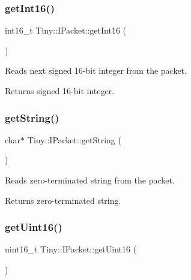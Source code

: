 \subsubsection{\texorpdfstring{get\+Int16()}{getInt16()}}
{\footnotesize\ttfamily int16\+\_\+t Tiny\+::\+I\+Packet\+::get\+Int16 (\begin{DoxyParamCaption}{ }\end{DoxyParamCaption})\hspace{0.3cm}{\ttfamily [inline]}}

Reads next signed 16-\/bit integer from the packet. \begin{DoxyReturn}{Returns}
signed 16-\/bit integer. 
\end{DoxyReturn}
\mbox{\label{classTiny_1_1IPacket_ac6e6a22ce9a652954491a8d4db081d79}} 
\subsubsection{\texorpdfstring{get\+String()}{getString()}}
{\footnotesize\ttfamily char$\ast$ Tiny\+::\+I\+Packet\+::get\+String (\begin{DoxyParamCaption}{ }\end{DoxyParamCaption})\hspace{0.3cm}{\ttfamily [inline]}}

Reads zero-\/terminated string from the packet. \begin{DoxyReturn}{Returns}
zero-\/terminated string. 
\end{DoxyReturn}
\mbox{\label{classTiny_1_1IPacket_a345d5d5791d5929c9a5f9bb2763f99a5}} 
\subsubsection{\texorpdfstring{get\+Uint16()}{getUint16()}}
{\footnotesize\ttfamily uint16\+\_\+t Tiny\+::\+I\+Packet\+::get\+Uint16 (\begin{DoxyParamCaption}{ }\end{DoxyParamCaption})\hspace{0.3cm}{\ttfamily [inline]}}

